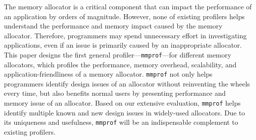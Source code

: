 The memory allocator is a critical component that can impact the performance of an application by orders of magnitude. However, none of existing profilers helps understand the performance and memory impact caused by the memory allocator. Therefore, programmers may spend unnecessary effort in investigating applications, even if an issue is primarily caused by an inappropriate allocator. This paper designs the first general profiler---\texttt{mmprof}---for different memory allocators, which profiles the performance, memory overhead, scalability, and application-friendliness of a memory allocator. \texttt{mmprof} not only helps programmers identify design issues of an allocator without reinventing the wheels every time, but also benefits normal users by presenting performance and memory issue of an allocator. Based on our extensive evaluation, \texttt{mmprof} helps identify multiple known and new design issues in widely-used allocators. 
Due to its uniqueness and usefulness, \texttt{mmprof} will be an indispensable complement to existing profilers. 


 